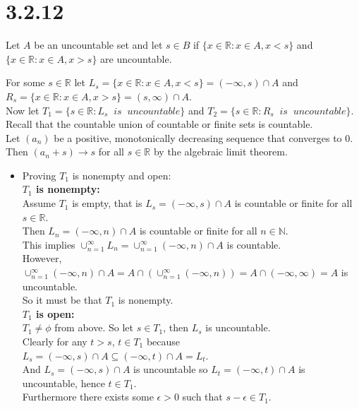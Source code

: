 \documentclass{article}
\begin{document}
\section*{3.2.12} Let $A$ be an uncountable set and let $s\in B$ if $\{x\in\mathbb{R} : x\in A, x < s\}$ and $\{x\in\mathbb{R} : x\in A, x > s\}$ are uncountable.
\begin{center}
    \doublespacing
    For some $s\in\mathbb{R}$ let $L_s = \{x\in\mathbb{R} : x\in A, x < s\} = (-\infty, s)\cap A$ and $R_s = \{x\in\mathbb{R} : x\in A, x > s\} = (s, \infty)\cap A$.
    \\Now let $T_1 = \{s\in\mathbb{R} : L_s\;\;is\;\;uncountable\}$ and $T_2 = \{s\in\mathbb{R} : R_s\;\;is\;\;uncountable\}$.
    \\Recall that the countable union of countable or finite sets is countable.
    \\Let $(a_n)$ be a positive, monotonically decreasing sequence that converges to 0.
    \\Then $(a_n + s)\rightarrow s$ for all $s\in\mathbb{R}$ by the algebraic limit theorem.
    \begin{itemize}
        \item Proving $T_1$ is nonempty and open:
        \\\textbf{$T_1$ is nonempty:}
        \\Assume $T_1$ is empty, that is $L_s = (-\infty, s)\cap A$ is countable or finite for all $s\in\mathbb{R}$.
        \\Then $L_n = (-\infty, n)\cap A$ is countable or finite for all $n\in\mathbb{N}$.
        \\This implies $\cup _{n=1}^{\infty} L_n =\cup _{n=1}^{\infty} (-\infty, n)\cap A$ is countable.
        \\However, $\cup _{n=1}^{\infty} (-\infty, n)\cap A = A\cap (\cup _{n=1}^{\infty} (-\infty, n)) = A\cap (-\infty, \infty) = A$ is uncountable.
        \\So it must be that $T_1$ is nonempty.
        \\\textbf{$T_1$ is open:}
        \\$T_1\neq\phi$ from above. So let $s\in T_1$, then $L_s$ is uncountable.
        \\Clearly for any $t > s$, $t\in T_1$ because $L_s = (-\infty, s)\cap A\subseteq (-\infty, t)\cap A = L_t$.
        \\And $L_s = (-\infty, s)\cap A$ is uncountable so $L_t = (-\infty, t)\cap A$ is uncountable, hence $t\in T_1$.
        \\Furthermore there exists some $\epsilon > 0$ such that $s -\epsilon\in T_1$.

\end{itemize}
\end{center}
\end{document}
